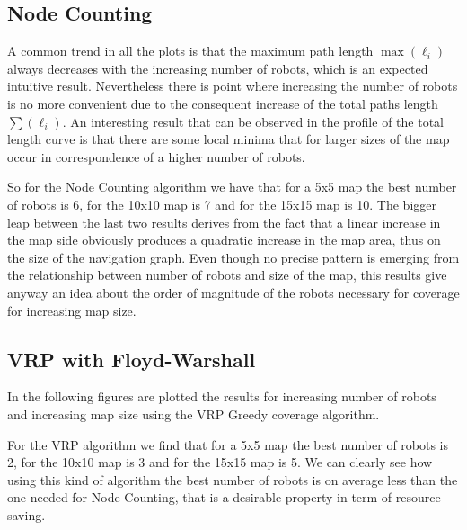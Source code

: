 
\subsection{Node Counting}
A common trend in all the plots is that the maximum path length $\max (\ell_i)$ always decreases with the increasing number of robots, which is an expected intuitive result. Nevertheless there is point where increasing the number of robots is no more convenient due to the consequent increase of the total paths length $\sum (\ell_i)$. An interesting result that can be observed in the profile of the total length curve is that there are some local minima that for larger sizes of the map occur in correspondence of a higher number of robots.

%







So for the Node Counting algorithm we have that for a 5x5 map the best number of robots is 6, for the 10x10 map is 7 and for the 15x15 map is 10. The bigger leap between the last two results derives from the fact that a linear increase in the map side obviously produces a quadratic increase in the map area, thus on the size of the navigation graph. Even though no precise pattern is emerging from the relationship between number of robots and size of the map, this results give anyway an idea about the order of magnitude of the robots necessary for coverage for increasing map size.






\subsection{VRP with Floyd-Warshall}
In the following figures are plotted the results for increasing number of robots and increasing map size using the VRP Greedy coverage algorithm.

%



For the VRP algorithm we find that for a 5x5 map the best number of robots is 2, for the 10x10 map is 3 and for the 15x15 map is 5. We can clearly see how using this kind of algorithm the best number of robots is on average less than the one needed for Node Counting, that is a desirable property in term of resource saving.

